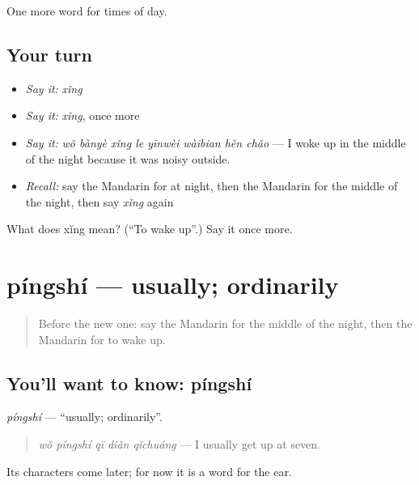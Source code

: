 \begin{grammarlens}[title={What you've built}]
One more word for times of day.
\end{grammarlens}

\subsection*{Your turn}
\begin{itemize}
\raggedright
  \item \emph{Say it:} \emph{xǐng}
  \item \emph{Say it:} \emph{xǐng}, once more
  \item \emph{Say it:} \emph{wǒ bànyè xǐng le yīnwèi wàibian hěn chǎo} — I woke up in the middle of the night because it was noisy outside.
  \item \emph{Recall:} say the Mandarin for at night, then the Mandarin for the middle of the night, then say \emph{xǐng} again
\end{itemize}

\begin{tcolorbox}[breakable,colback=teal!4,colframe=teal!35!black,title={Before you move on}]
What does xǐng mean? (\textquotedblleft{}To wake up\textquotedblright{}.) Say it once more.
\end{tcolorbox}
\section[píngshí]{píngshí — usually; ordinarily}

\label{lesson:ZH-C146-pingshi}



\begin{quote}
Before the new one: say the Mandarin for the middle of the night, then the Mandarin for to wake up.
\end{quote}

\subsection*{You'll want to know: píngshí}
\emph{píngshí} — \textquotedblleft{}usually; ordinarily\textquotedblright{}.

\begin{quote}
\emph{wǒ píngshí qī diǎn qǐchuáng} — I usually get up at seven.
\end{quote}

Its characters come later; for now it is a word for the ear.

